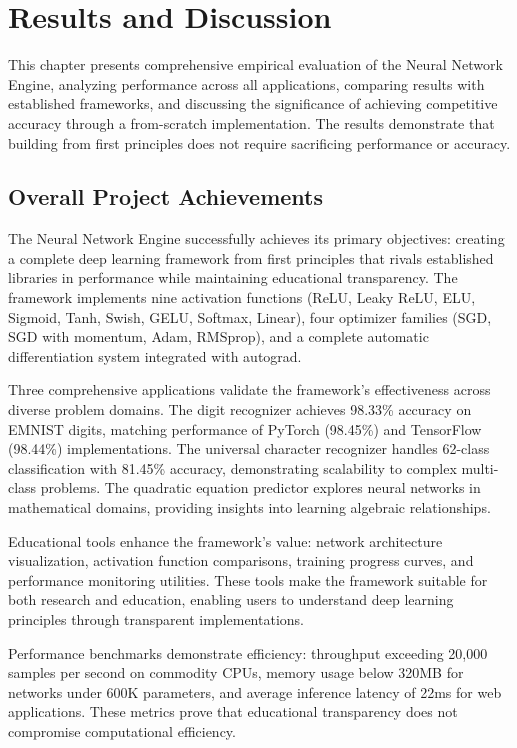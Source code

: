 \documentclass[11pt,a4paper]{report}
\begin{document}
\chapter{Results and Discussion}

This chapter presents comprehensive empirical evaluation of the Neural Network Engine, analyzing performance across all applications, comparing results with established frameworks, and discussing the significance of achieving competitive accuracy through a from-scratch implementation. The results demonstrate that building from first principles does not require sacrificing performance or accuracy.

\section{Overall Project Achievements}

The Neural Network Engine successfully achieves its primary objectives: creating a complete deep learning framework from first principles that rivals established libraries in performance while maintaining educational transparency. The framework implements nine activation functions (ReLU, Leaky ReLU, ELU, Sigmoid, Tanh, Swish, GELU, Softmax, Linear), four optimizer families (SGD, SGD with momentum, Adam, RMSprop), and a complete automatic differentiation system integrated with autograd.

Three comprehensive applications validate the framework's effectiveness across diverse problem domains. The digit recognizer achieves 98.33\% accuracy on EMNIST digits, matching performance of PyTorch (98.45\%) and TensorFlow (98.44\%) implementations. The universal character recognizer handles 62-class classification with 81.45\% accuracy, demonstrating scalability to complex multi-class problems. The quadratic equation predictor explores neural networks in mathematical domains, providing insights into learning algebraic relationships.

Educational tools enhance the framework's value: network architecture visualization, activation function comparisons, training progress curves, and performance monitoring utilities. These tools make the framework suitable for both research and education, enabling users to understand deep learning principles through transparent implementations.

Performance benchmarks demonstrate efficiency: throughput exceeding 20,000 samples per second on commodity CPUs, memory usage below 320MB for networks under 600K parameters, and average inference latency of 22ms for web applications. These metrics prove that educational transparency does not compromise computational efficiency.
\end{document}

